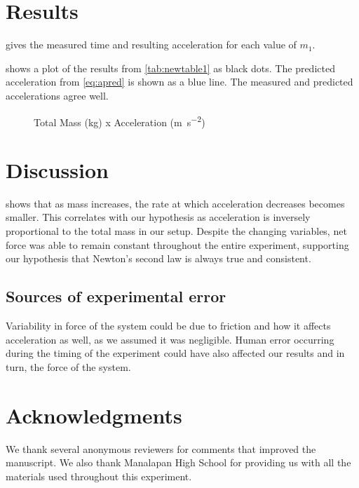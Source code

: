 ﻿\documentclass[reprint,amsmath,amssymb,aps]{revtex4-2}
\begin{document}
\section{Results}
 gives the measured time and resulting acceleration for each value of $m_1$. 

%	
%
 shows a plot of the results from \cref{tab:newtable1} as black dots. The predicted acceleration from \cref{eq:apred} is shown as a blue line. The measured and predicted accelerations agree well. 
\begin{figure}
\begin{center}

\end{center}
\caption{Total Mass (\unit{\kilo\gram}) x Acceleration (\unit{\meter\per\second\squared})}
\label{fig:2}
\end{figure}


\section{Discussion}
 shows that as mass increases, the rate at which acceleration decreases becomes smaller. This correlates with our hypothesis as acceleration is inversely proportional to the total mass in our setup. Despite the changing variables, net force was able to remain constant throughout the entire experiment, supporting our hypothesis that Newton’s second law is always true and consistent. 

\subsection{Sources of experimental error}
Variability in force of the system could be due to friction and how it affects acceleration as well, as we assumed it was negligible. Human error occurring during the timing of the experiment could have also affected our results and in turn, the force of the system. 

\section{Acknowledgments}
We thank several anonymous reviewers for comments that improved the manuscript. We also thank Manalapan High School for providing us with all the materials used throughout this experiment. 
\end{document}
